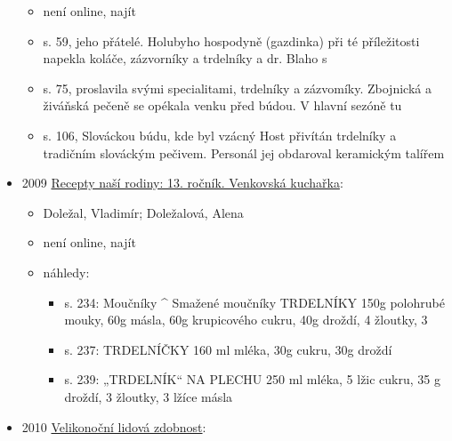 \begin{itemize}
  \begin{itemize}
  \tightlist
  \item
    není online, najít
  \item
    s. 59, jeho přátelé. Holubyho hospodyně (gazdinka) při té
    příležitosti napekla koláče, zázvorníky a trdelníky a dr. Blaho s
  \item
    s. 75, proslavila svými specialitami, trdelníky a zázvomíky.
    Zbojnická a živáňská pečeně se opékala venku před búdou. V hlavní
    sezóně tu
  \item
    s. 106, Slováckou búdu, kde byl vzácný Host přivítán trdelníky a
    tradičním slováckým pečivem. Personál jej obdaroval keramickým
    talířem
  \end{itemize}
\item
  2009
  \href{https://ceskadigitalniknihovna.cz/uuid/uuid:33331cf0-d935-11e5-a3e0-005056827e51}{Recepty
  naší rodiny: 13. ročník. Venkovská kuchařka}:

  \begin{itemize}
  \tightlist
  \item
    Doležal, Vladimír; Doležalová, Alena
  \item
    není online, najít
  \item
    náhledy:

    \begin{itemize}
    \tightlist
    \item
      s. 234: Moučníky \^{} Smažené moučníky TRDELNÍKY 150g polohrubé
      mouky, 60g másla, 60g krupicového cukru, 40g droždí, 4 žloutky, 3
    \item
      s. 237: TRDELNÍČKY 160 ml mléka, 30g cukru, 30g droždí
    \item
      s. 239: „TRDELNÍK`` NA PLECHU 250 ml mléka, 5 lžic cukru, 35 g
      droždí, 3 žloutky, 3 lžíce másla
    \end{itemize}
  \end{itemize}
\item
  2010
  \href{https://ceskadigitalniknihovna.cz/uuid/uuid:553c58c0-69fe-11eb-9f97-005056827e51}{Velikonoční
  lidová zdobnost}:


\end{itemize}
